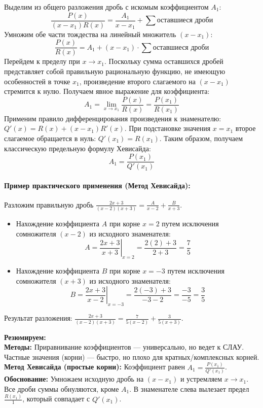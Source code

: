 Выделим из общего разложения дробь с искомым коэффициентом $A_1$:
$$ \frac{P(x)}{(x-x_1)R(x)} = \frac{A_1}{x-x_1} + \sum \text{оставшиеся дроби} $$
Умножим обе части тождества на линейный множитель $(x - x_1)$:
$$ \frac{P(x)}{R(x)} = A_1 + (x - x_1) \cdot \sum \text{оставшиеся дроби} $$
Перейдем к пределу при $x \to x_1$. Поскольку сумма оставшихся дробей представляет собой правильную рациональную функцию, не имеющую особенностей в точке $x_1$, произведение второго слагаемого на $(x-x_1)$ стремится к нулю. Получаем явное выражение для коэффициента:
$$ A_1 = \lim_{x \to x_1} \frac{P(x)}{R(x)} = \frac{P(x_1)}{R(x_1)} $$
Применим правило дифференцирования произведения к знаменателю: $Q'(x) = R(x) + (x - x_1)R'(x)$. При подстановке значения $x = x_1$ второе слагаемое обращается в нуль: $Q'(x_1) = R(x_1)$. Таким образом, получаем классическую предельную формулу Хевисайда:
$$ A_1 = \frac{P(x_1)}{Q'(x_1)} $$

\paragraph{Пример практического применения (Метод Хевисайда):}
Разложим правильную дробь $\frac{2x + 3}{(x-2)(x+3)} = \frac{A}{x-2} + \frac{B}{x+3}$.
\begin{itemize}
    \item Нахождение коэффициента $A$ при корне $x = 2$ путем исключения сомножителя $(x-2)$ из исходного знаменателя:
    $$ A = \left. \frac{2x + 3}{x + 3} \right|_{x=2} = \frac{2(2) + 3}{2 + 3} = \frac{7}{5} $$
    \item Нахождение коэффициента $B$ при корне $x = -3$ путем исключения сомножителя $(x+3)$ из исходного знаменателя:
    $$ B = \left. \frac{2x + 3}{x - 2} \right|_{x=-3} = \frac{2(-3) + 3}{-3 - 2} = \frac{-3}{-5} = \frac{3}{5} $$
\end{itemize}
Результат разложения: $\frac{2x + 3}{(x-2)(x+3)} = \frac{7}{5(x-2)} + \frac{3}{5(x+3)}$.


\begin{tcolorbox}[colback=gray!5, colframe=black, boxrule=0.5pt, arc=0pt]
\textbf{Резюмируем:} \\
\textbf{Методы:} Приравнивание коэффициентов — универсально, но ведет к СЛАУ. Частные значения (корни) — быстро, но плохо для кратных/комплексных корней. \\
\textbf{Метод Хевисайда (простые корни):} Коэффициент равен $A_1=\frac{P(x_1)}{Q'(x_1)}$. \\
\textbf{Обоснование:} Умножаем исходную дробь на $(x-x_1)$ и устремляем $x\to x_1$. Все дроби суммы обнуляются, кроме $A_1$. В знаменателе слева вылезает предел $\frac{R(x_1)}{1}$, который совпадает с $Q'(x_1)$.
\end{tcolorbox}




